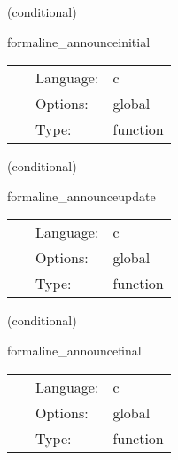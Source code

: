 \vspace{5mm}

   (conditional) 

\hspace{5mm} formaline\_announceinitial 

\hspace{5mm}{\it put some meta information about the current run into permanent storage } 


\hspace{5mm}

 \begin{tabular*}{160mm}{cll} 
~ & Language:  & c \\ 
~ & Options:  & global \\ 
~ & Type:  & function \\ 
\end{tabular*} 


\vspace{5mm}

   (conditional) 

\hspace{5mm} formaline\_announceupdate 

\hspace{5mm}{\it put some meta information about the current run into permanent storage } 


\hspace{5mm}

 \begin{tabular*}{160mm}{cll} 
~ & Language:  & c \\ 
~ & Options:  & global \\ 
~ & Type:  & function \\ 
\end{tabular*} 


\vspace{5mm}

   (conditional) 

\hspace{5mm} formaline\_announcefinal 

\hspace{5mm}{\it put some meta information about the current run into permanent storage } 


\hspace{5mm}

 \begin{tabular*}{160mm}{cll} 
~ & Language:  & c \\ 
~ & Options:  & global \\ 
~ & Type:  & function \\ 
\end{tabular*} 


